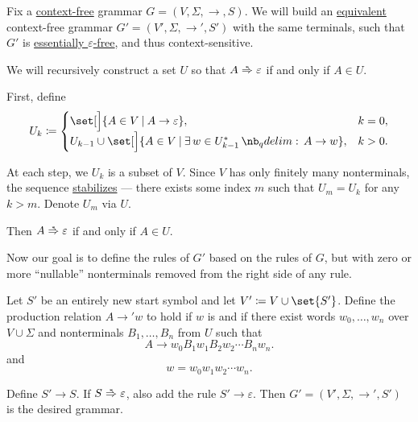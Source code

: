 \begin{algorithm}\label{alg:epsilon_rule_removal}
  Fix a \hyperref[def:chomsky_hierarchy/context_free]{context-free} grammar \( G = (V, \Sigma, \to, S) \). We will build an \hyperref[def:formal_grammar/equivalent]{equivalent} context-free grammar \( G' = (V', \Sigma, \to', S') \) with the same terminals, such that \( G' \) is \hyperref[def:epsilon_free_grammar]{essentially \( \varepsilon \)-free}, and thus context-sensitive.

  \begin{thmenum}
     We will recursively construct a set \( U \) so that \( A \reloset {*} \Rightarrow \varepsilon \) if and only if \( A \in U \).

    First, define
    \begin{equation*}
      U_k \coloneqq \begin{cases}
        \set[\Big]{ A \in V \given A \to \varepsilon },                               &k = 0, \\
        U_{k-1} \cup \set[\Big]{ A \in V \given \qexists*{w \in U_{k-1}^*} A \to w }, &k > 0.
      \end{cases}
    \end{equation*}

    At each step, we \( U_k \) is a subset of \( V \). Since \( V \) has only finitely many nonterminals, the sequence \hyperref[def:stabilizing_sequence]{stabilizes} --- there exists some index \( m \) such that \( U_m = U_k \) for any \( k > m \). Denote \( U_m \) via \( U \).

    Then \( A \reloset {*} \Rightarrow \varepsilon \) if and only if \( A \in U \).

     Now our goal is to define the rules of \( G' \) based on the rules of \( G \), but with zero or more \enquote{nullable} nonterminals removed from the right side of any rule.

    Let \( S' \) be an entirely new start symbol and let \( V' \coloneqq V \cup \set{ S' } \). Define the production relation \( A \to' w \) to hold if \( w \) is  and if there exist words \( w_0, \ldots, w_n \) over \( V \cup \Sigma \) and nonterminals \( B_1, \ldots, B_n \) from \( U \) such that
    \begin{equation*}
      A \to w_0 B_1 w_1 B_2 w_2 \cdots B_n w_n.
    \end{equation*}
    and
    \begin{equation*}
      w = w_0 w_1 w_2 \cdots w_n.
    \end{equation*}

     Define \( S' \to S \). If \( S \reloset {*} \Rightarrow \varepsilon \), also add the rule \( S' \to \varepsilon \). Then \( G' = (V', \Sigma, \to', S') \) is the desired grammar.
  \end{thmenum}
\end{algorithm}

